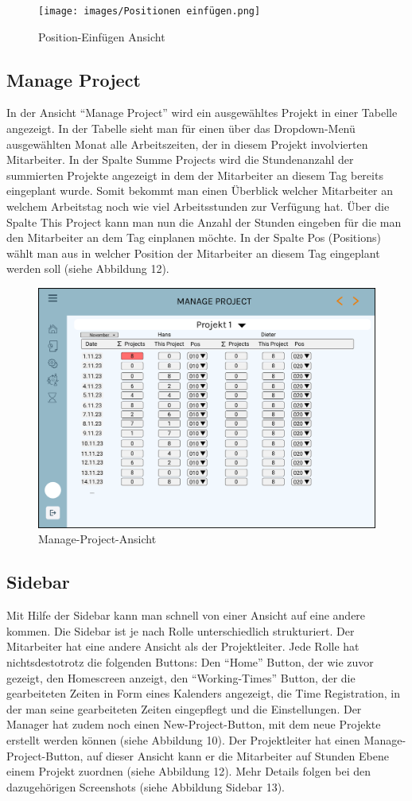 \documentclass{article}
\begin{document}
\begin{figure}[h]
    \texttt{[image: images/Positionen einfügen.png]}
    \caption{Position-Einfügen Ansicht}
    \label{fig:beispiel}
\end{figure}

\subsection{Manage Project}
In der Ansicht “Manage Project” wird ein ausgewähltes Projekt in einer Tabelle
angezeigt. In der Tabelle sieht man für einen über das Dropdown-Menü
ausgewählten Monat alle Arbeitszeiten, der in diesem Projekt involvierten
Mitarbeiter. In der Spalte Summe Projects wird die Stundenanzahl der summierten
Projekte angezeigt in dem der Mitarbeiter an diesem Tag bereits eingeplant
wurde. Somit bekommt man einen Überblick welcher Mitarbeiter an welchem
Arbeitstag noch wie viel Arbeitsstunden zur Verfügung hat. Über die Spalte This
Project kann man nun die Anzahl der Stunden eingeben für die man den
Mitarbeiter an dem Tag einplanen möchte. In der Spalte Pos (Positions) wählt
man aus in welcher Position der Mitarbeiter an diesem Tag eingeplant werden
soll (siehe Abbildung 12).

\begin{figure}[h]
    \includegraphics[height= 0.5\textwidth,width= \textwidth]{images/ManageProject1.png}
    \caption{Manage-Project-Ansicht}
    \label{fig:beispiel}
\end{figure}

\newpage

\subsection{Sidebar}
Mit Hilfe der Sidebar kann man schnell von einer Ansicht auf eine andere
kommen. Die Sidebar ist je nach Rolle unterschiedlich strukturiert. Der
Mitarbeiter hat eine andere Ansicht als der Projektleiter. Jede Rolle hat
nichtsdestotrotz die folgenden Buttons: Den “Home” Button, der wie zuvor
gezeigt, den Homescreen anzeigt, den “Working-Times” Button, der die
gearbeiteten Zeiten in Form eines Kalenders angezeigt, die Time Registration,
in der man seine gearbeiteten Zeiten eingepflegt und die Einstellungen. Der
Manager hat zudem noch einen New-Project-Button, mit dem neue Projekte erstellt
werden können (siehe Abbildung 10). Der Projektleiter hat einen
Manage-Project-Button, auf dieser Ansicht kann er die Mitarbeiter auf Stunden
Ebene einem Projekt zuordnen (siehe Abbildung 12). Mehr Details folgen bei den
dazugehörigen Screenshots (siehe Abbildung Sidebar 13).
\end{document}

